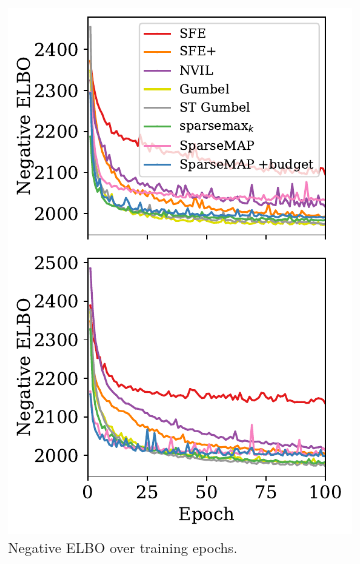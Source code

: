 \begin{figure}[ht]
    \centering
    \begin{subfigure}[b]{0.49\textwidth}
        \centering
        \includegraphics[width=\textwidth]{Figures/elbo-bit-vector.pdf}
        \caption{Negative ELBO over training epochs.}
        \label{fig:elbo_bit_epochs}
    \end{subfigure}
    \begin{subfigure}[b]{0.49\textwidth}
        \centering

\end{subfigure}
\end{figure}
